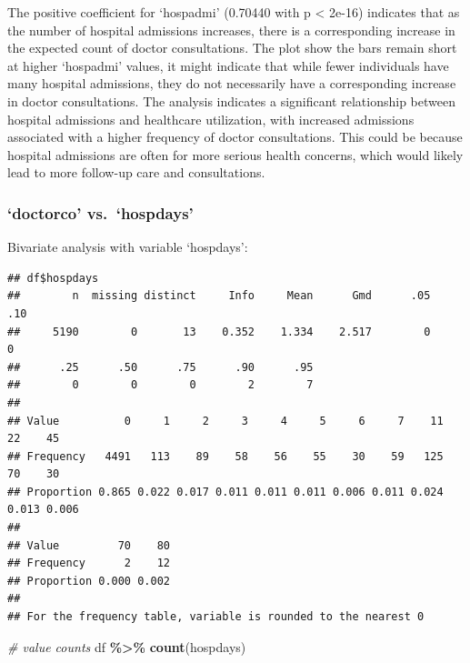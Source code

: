 \documentclass[
]{article}
\newenvironment{Shaded}{\begin{snugshade}}{\end{snugshade}}
\newcommand{\CommentTok}[1]{\textcolor[rgb]{0.56,0.35,0.01}{\textit{#1}}}
\newcommand{\FunctionTok}[1]{\textcolor[rgb]{0.13,0.29,0.53}{\textbf{#1}}}
\newcommand{\NormalTok}[1]{#1}
\newcommand{\SpecialCharTok}[1]{\textcolor[rgb]{0.81,0.36,0.00}{\textbf{#1}}}
\begin{document}
The positive coefficient for `hospadmi' (0.70440 with p \textless{}
2e-16) indicates that as the number of hospital admissions increases,
there is a corresponding increase in the expected count of doctor
consultations. The plot show the bars remain short at higher `hospadmi'
values, it might indicate that while fewer individuals have many
hospital admissions, they do not necessarily have a corresponding
increase in doctor consultations. The analysis indicates a significant
relationship between hospital admissions and healthcare utilization,
with increased admissions associated with a higher frequency of doctor
consultations. This could be because hospital admissions are often for
more serious health concerns, which would likely lead to more follow-up
care and consultations.

\subsubsection{`doctorco' vs.~`hospdays'}\label{doctorco-vs.-hospdays}

Bivariate analysis with variable `hospdays':

\begin{Shaded}
\end{Shaded}

\begin{verbatim}
## df$hospdays 
##        n  missing distinct     Info     Mean      Gmd      .05      .10 
##     5190        0       13    0.352    1.334    2.517        0        0 
##      .25      .50      .75      .90      .95 
##        0        0        0        2        7 
##                                                                             
## Value          0     1     2     3     4     5     6     7    11    22    45
## Frequency   4491   113    89    58    56    55    30    59   125    70    30
## Proportion 0.865 0.022 0.017 0.011 0.011 0.011 0.006 0.011 0.024 0.013 0.006
##                       
## Value         70    80
## Frequency      2    12
## Proportion 0.000 0.002
## 
## For the frequency table, variable is rounded to the nearest 0
\end{verbatim}

\begin{Shaded}
\begin{Highlighting}[]
\CommentTok{\# value counts}
\NormalTok{df }\SpecialCharTok{\%\textgreater{}\%} \FunctionTok{count}\NormalTok{(hospdays)}
\end{Highlighting}
\end{Shaded}
\end{document}
